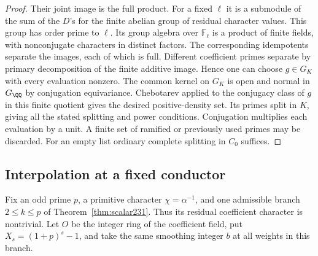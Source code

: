 \documentclass[a4paper,11pt]{article}
\theoremstyle{definition}
\theoremstyle{remark}
\numberwithin{equation}{section}
\begin{document}
\begin{proof}
Their joint image is the full product. For a fixed \(\ell\)
it is a submodule of the sum of the \(D\)'s for the
finite abelian group of residual character values. This group
has order prime to \(\ell\). Its group algebra over
\(\mathbb F_\ell\) is a product of finite fields, with
nonconjugate characters in distinct factors. The corresponding
idempotents separate the images, each of which is full.
Different coefficient primes separate by primary decomposition
of the finite additive image. Hence one can choose \(g\in G_K\)
with every evaluation nonzero. The common kernel on \(G_K\)
is open and normal in \(G_\QQ\) by conjugation equivariance.
Chebotarev applied to the conjugacy class of \(g\) in this
finite quotient gives the desired positive-density set.
Its primes split in \(K\), giving all the stated splitting
and power conditions. Conjugation multiplies each evaluation
by a unit. A finite set of ramified or previously used primes
may be discarded. For an empty list ordinary complete splitting
in \(C_0\) suffices.
\end{proof}

\subsection{Interpolation at a fixed conductor}\label{nav:III-35}
Fix an odd prime \(p\), a primitive character \(\chi=\alpha^{-1}\),
and one admissible branch \(2\le k\le p\) of
Theorem~\ref{thm:scalar231}. Thus its residual coefficient
character is nontrivial. Let \(O\) be the integer ring of the
coefficient field, put \(X_s=(1+p)^s-1\), and take the same
smoothing integer \(b\) at all weights in this branch.
\end{document}
